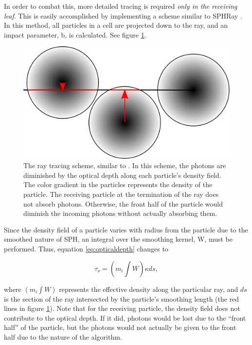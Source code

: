 In order to combat this, more detailed tracing is required \emph{only in the receiving leaf}. This is easily accomplished by implementing a scheme similar to SPHRay \citep{altayEt08}. In this method, all particles in a cell are projected down to the ray, and an impact parameter, b, is calculated. See figure \ref{fig:particletracing}.

\begin{figure}
\includegraphics[width=\textwidth]{graphics/raytrace.eps}
\caption[Ray tracing schemes for receiving cells.]{The ray tracing scheme, similar to \citet{altayEt08}. In this scheme, the photons are diminished by the optical depth along each particle's density field. The color gradient in the particles represents the density of the particle. The receiving particle at the termination of the ray does not absorb photons. Otherwise, the front half of the particle would diminish the incoming photons without actually absorbing them.}
\label{fig:particletracing}
\end{figure}

Since the density field of a particle varies with radius from the particle due to the smoothed nature of SPH, an integral over the smoothing kernel, W,  must be performed. Thus, equation \ref{eq:opticaldepth} changes to

\begin{equation}
\label{eq:kernelintegral}
\tau_{\nu} = (m_i\int W)\kappa ds,
\end{equation}

\noindent
where $(m_i\int W)$ represents the effective density along the particular ray, and $ds$ is the section of the ray intersected by the particle's smoothing length (the red lines in figure \ref{fig:particletracing}). Note that for the receiving particle, the density field does not contribute to the optical depth. If it did, photons would be lost due to the ``front half'' of the particle, but the photons would not actually be given to the front half due to the nature of the algorithm.

